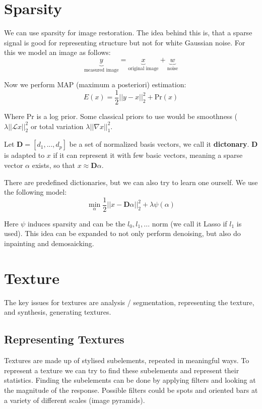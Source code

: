 \section{Sparsity}

We can use sparsity for image restoration. The idea behind this is, that a sparse signal is good for representing structure but not for white Gaussian noise. For this we model an image as follows:
$$\underbrace{y}_{\text{measured image}} = \underbrace{x}_{\text{original image}} + \underbrace{w}_{\text{noise}}$$

Now we perform MAP (maximum a posteriori) estimation:
$$E(x) = \frac{1}{2} ||y-x||_2^2 + \text{Pr}(x)$$

Where Pr is a log prior. Some classical priors to use would be smoothness ($\lambda || \mathcal L x||_2^2$ or total variation $\lambda ||\nabla x ||_1^2$. \medskip

Let $\mathbf D = [d_1, ..., d_p]$ be a set of normalized basis vectors, we call it \textbf{dictonary}. $\mathbf D$ is adapted to $x$ if it can represent it with few basic vectors, meaning a sparse vector $\alpha$ exists, so that $x \approx \mathbf D \alpha$. \medskip

There are predefined dictionaries, but we can also try to learn one ourself. We use the following model:
$$\min_{\alpha} \frac{1}{2} ||x - \mathbf D \alpha||_2^2 + \lambda \psi (\alpha)$$

Here $\psi$ induces sparsity and can be the $l_0, l_1, ...$ norm (we call it Lasso if $l_1$ is used). This idea can be expanded to not only perform denoising, but also do inpainting and demosaicking.


\section{Texture}

The key issues for textures are analysis / segmentation, representing the texture, and synthesis, generating textures.

\subsection{Representing Textures}

Textures are made up of stylised subelements, repeated in meaningful ways. To represent a texture we can try to find these subelements and represent their statistics. Finding the subelements can be done by applying filters and looking at the magnitude of the response. Possible filters could be spots and oriented bars at a variety of different scales (image pyramids).


